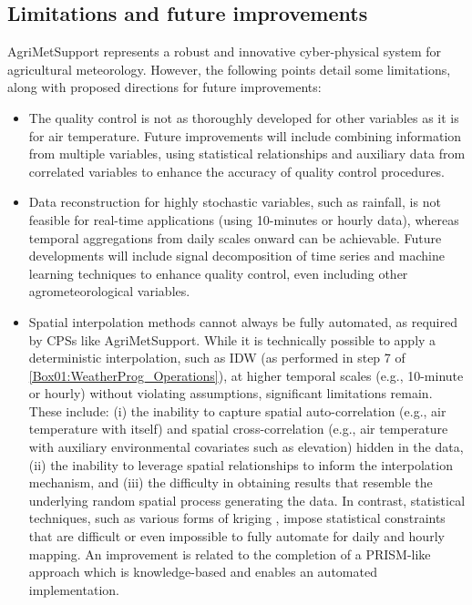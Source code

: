 \documentclass[authoryear,preprint,review,12pt]{elsarticle}
\newcommand{\statusblock}[3]{
    \ifthenelse{\equal{#2}{todo}}
        {\textcolor{red}{#1 (TO DO): #3}}
        {}
    \ifthenelse{\equal{#2}{wip}}
        {\textcolor{magenta}{#1 (IN PROGRESS): #3}}
        {}
    \ifthenelse{\equal{#2}{update}}
        {\textcolor{blue}{#1 (UPDATE): #3}}
        {}
    \ifthenelse{\equal{#2}{review}}
        {\textcolor{cyan}{#1 (REVIEW): #3}}
        {}
    \ifthenelse{\equal{#2}{done}}
        {\textcolor{PineGreen}{#1 (READY): #3}}
        {}
}
\begin{document}
\subsection{Limitations and future improvements}
AgriMetSupport represents a robust and innovative cyber-physical system for agricultural meteorology.
However, the following points detail some limitations, along with proposed directions for future improvements:
\begin{itemize}
    \item %
    The quality control is not as thoroughly developed for other variables as it is for air temperature. Future improvements will include combining information from multiple variables, using statistical relationships and auxiliary data from correlated variables to enhance the accuracy of quality control procedures.
    
    \item Data reconstruction for highly stochastic variables, such as rainfall, is not feasible for real-time applications (using 10-minutes or hourly data), whereas temporal aggregations from daily scales onward can be achievable. Future developments will include signal decomposition of time series and machine learning techniques to enhance quality control, even including other agrometeorological variables.
    
    \item Spatial interpolation methods cannot always be fully automated, as required by CPSs like AgriMetSupport.  
    While it is technically possible to apply a deterministic interpolation, such as IDW (as performed in step 7 of \cref{Box01:WeatherProg_Operations}), at higher temporal scales (e.g., 10-minute or hourly) without violating assumptions, significant limitations remain.  
    These include: (i) the inability to capture spatial auto-correlation (e.g., air temperature with itself) and spatial cross-correlation (e.g., air temperature with auxiliary environmental covariates such as elevation) hidden in the data, (ii) the inability to leverage spatial relationships to inform the interpolation mechanism, and (iii) the difficulty in obtaining results that resemble the underlying random spatial process generating the data.  
    In contrast, statistical techniques, such as various forms of kriging \citep{Goovaerts1997_book}, impose statistical constraints that are difficult or even impossible to fully automate for daily and hourly mapping.
    An improvement is related to the completion of a PRISM-like approach which is knowledge-based and enables an automated implementation.


\end{itemize}
\end{document}
